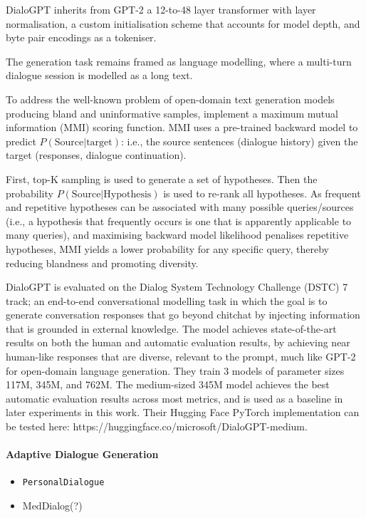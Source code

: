 DialoGPT inherits from GPT-2 a 12-to-48 layer transformer with layer normalisation, a custom initialisation scheme that accounts for model depth, and byte pair encodings \cite{sennrich-etal-2016-neural} as a tokeniser.

The generation task remains framed as language modelling, where a multi-turn dialogue session is modelled as a long text. 

To address the well-known problem of open-domain text generation models producing bland and uninformative samples, \citeauthor{zhang2019dialogpt} implement a maximum mutual information (MMI) scoring function. MMI uses a pre-trained backward model to predict $P(\text{Source} | \text{target})$: i.e., the source sentences (dialogue history) given the target (responses, dialogue continuation). 

First, top-K sampling is used to generate a set of hypotheses. Then the probability $P(\text{Source} | \text{Hypothesis})$ is used to re-rank all hypotheses. As frequent and repetitive hypotheses can be associated with many possible queries/sources (i.e., a hypothesis that frequently occurs is one that is apparently applicable to many queries), and maximising backward model likelihood penalises repetitive hypotheses, MMI yields a lower probability for any specific query, thereby reducing blandness and promoting diversity.

DialoGPT is evaluated on the Dialog System Technology Challenge (DSTC) 7 track; an end-to-end conversational modelling task in which the goal is to generate conversation responses that go beyond chitchat by injecting information that is grounded in external knowledge. The model achieves state-of-the-art results on both the human and automatic evaluation results, by achieving near human-like responses that are diverse, relevant to the prompt, much like GPT-2 for open-domain language generation. They train 3 models of parameter sizes 117M, 345M, and 762M. The medium-sized 345M model achieves the best automatic evaluation results across most metrics, and is used as a baseline in later experiments in this work. Their Hugging Face PyTorch implementation can be tested here: https://huggingface.co/microsoft/DialoGPT-medium.


\paragraph{Adaptive Dialogue Generation}
\begin{itemize}
    \item \texttt{PersonalDialogue}
    \item MedDialog(?)
\end{itemize}

